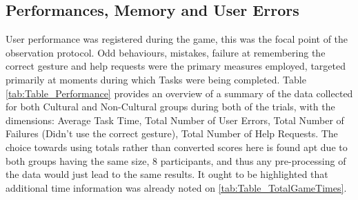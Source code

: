 \subsection{Performances, Memory and User Errors} \label{sec:results_game_performance}
    
    User performance was registered during the game, this was the focal point of the observation protocol. Odd behaviours, mistakes, failure at remembering the correct gesture and help requests were the primary measures employed, targeted primarily at moments during which Tasks were being completed. Table \ref{tab:Table_Performance} provides an overview of a summary of the data collected for both Cultural and Non-Cultural groups during both of the trials, with the dimensions: Average Task Time, Total Number of User Errors, Total Number of Failures (Didn’t use the correct gesture), Total Number of Help Requests. The choice towards using totals rather than converted scores here is found apt due to both groups having the same size, 8 participants, and thus any pre-processing of the data would just lead to the same results. It ought to be highlighted that additional time information was already noted on \ref{tab:Table_TotalGameTimes}.\\ 
    
